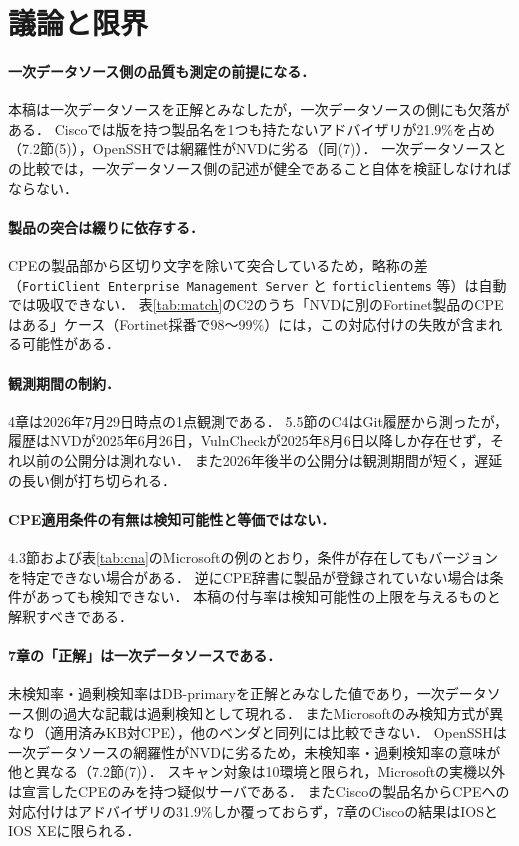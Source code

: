 \section{議論と限界}

\paragraph{一次データソース側の品質も測定の前提になる．}
本稿は一次データソースを正解とみなしたが，一次データソースの側にも欠落がある．
Ciscoでは版を持つ製品名を1つも持たないアドバイザリが21.9\%を占め（7.2節(5)），OpenSSHでは網羅性がNVDに劣る（同(7)）．
一次データソースとの比較では，一次データソース側の記述が健全であること自体を検証しなければならない．

\paragraph{製品の突合は綴りに依存する．}
CPEの製品部から区切り文字を除いて突合しているため，略称の差（\texttt{FortiClient Enterprise Management Server} と \texttt{forticlientems} 等）は自動では吸収できない．
表\ref{tab:match}のC2のうち「NVDに別のFortinet製品のCPEはある」ケース（Fortinet採番で98〜99\%）には，この対応付けの失敗が含まれる可能性がある．

\paragraph{観測期間の制約．}
4章は2026年7月29日時点の1点観測である．
5.5節のC4はGit履歴から測ったが，履歴はNVDが2025年6月26日，VulnCheckが2025年8月6日以降しか存在せず，それ以前の公開分は測れない．
また2026年後半の公開分は観測期間が短く，遅延の長い側が打ち切られる．

\paragraph{CPE適用条件の有無は検知可能性と等価ではない．}
4.3節および表\ref{tab:cna}のMicrosoftの例のとおり，条件が存在してもバージョンを特定できない場合がある．
逆にCPE辞書に製品が登録されていない場合は条件があっても検知できない．
本稿の付与率は検知可能性の上限を与えるものと解釈すべきである．

\paragraph{7章の「正解」は一次データソースである．}
未検知率・過剰検知率はDB-primaryを正解とみなした値であり，一次データソース側の過大な記載は過剰検知として現れる．
またMicrosoftのみ検知方式が異なり（適用済みKB対CPE），他のベンダと同列には比較できない．
OpenSSHは一次データソースの網羅性がNVDに劣るため，未検知率・過剰検知率の意味が他と異なる（7.2節(7)）．
スキャン対象は10環境と限られ，Microsoftの実機以外は宣言したCPEのみを持つ疑似サーバである．
またCiscoの製品名からCPEへの対応付けはアドバイザリの31.9\%しか覆っておらず，7章のCiscoの結果はIOSとIOS XEに限られる．

